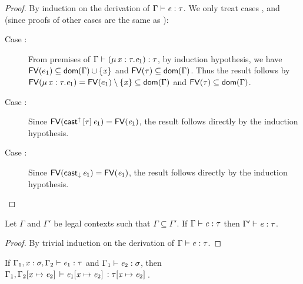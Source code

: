 \begin{proof}
    By induction on the derivation of $\Gamma  \vdash  \mathit{e}  :  \tau$. We only treat cases
,  and  (since proofs of
other cases are the same as \cc \cite{handbook}):
    \begin{description}
        \item[Case :] From premises of $\Gamma  \vdash  (  \mu \, \mathit{x}  :  \tau  .  \mathit{e_{{\mathrm{1}}}}  )  :  \tau$, by induction hypothesis, we have $\mathsf{FV}(e_1) \subseteq \mathsf{dom}(\Gamma) \cup
\{\mathit{x}\}$ and $\mathsf{FV}(\tau) \subseteq \mathsf{dom}(\Gamma)$. Thus the result follows by
$\mathsf{FV}(\mu \, \mathit{x}  :  \tau  .  \mathit{e_{{\mathrm{1}}}})=\mathsf{FV}(e_1) \setminus \{\mathit{x}\} \subseteq \mathsf{dom}(\Gamma)$ and
$\mathsf{FV}(\tau) \subseteq \mathsf{dom}(\Gamma)$.
        \item[Case :] Since $\mathsf{FV}(\mathsf{cast}^{\uparrow} \, [  \tau  ] \,  \mathit{e_{{\mathrm{1}}}})=\mathsf{FV}(\mathit{e_{{\mathrm{1}}}})$, the result follows directly by the induction hypothesis.
        \item[Case :] Since $\mathsf{FV}(\mathsf{cast}_{\downarrow} \, \mathit{e_{{\mathrm{1}}}})=\mathsf{FV}(\mathit{e_{{\mathrm{1}}}})$, the result follows directly by the induction hypothesis.
    \end{description}
\end{proof}

\begin{lem}[Thinning]\label{lem:appendix:thin}
    Let $\Gamma$ and $\Gamma'$ be legal contexts such that $\Gamma \subseteq
\Gamma'$. If $\Gamma  \vdash  \mathit{e}  :  \tau$ then $\Gamma'  \vdash  \mathit{e}  :  \tau$.
\end{lem}

\begin{proof}
    By trivial induction on the derivation of $\Gamma  \vdash  \mathit{e}  :  \tau$.
\end{proof}

\begin{lem}[Substitution]\label{lem:appendix:subst}
	If $\Gamma_{{\mathrm{1}}}  ,  \mathit{x}  :  \sigma  ,  \Gamma_{{\mathrm{2}}}  \vdash  \mathit{e_{{\mathrm{1}}}}  :  \tau$ and $\Gamma_{{\mathrm{1}}}  \vdash  \mathit{e_{{\mathrm{2}}}}  :  \sigma$, then $\Gamma_{{\mathrm{1}}}  ,  \Gamma_{{\mathrm{2}}}  [  \mathit{x}  \mapsto  \mathit{e_{{\mathrm{2}}}}  ] \,  \vdash  \mathit{e_{{\mathrm{1}}}}  [  \mathit{x}  \mapsto  \mathit{e_{{\mathrm{2}}}}  ] \,  :  \tau  [  \mathit{x}  \mapsto  \mathit{e_{{\mathrm{2}}}}  ] \,$.
\end{lem}

